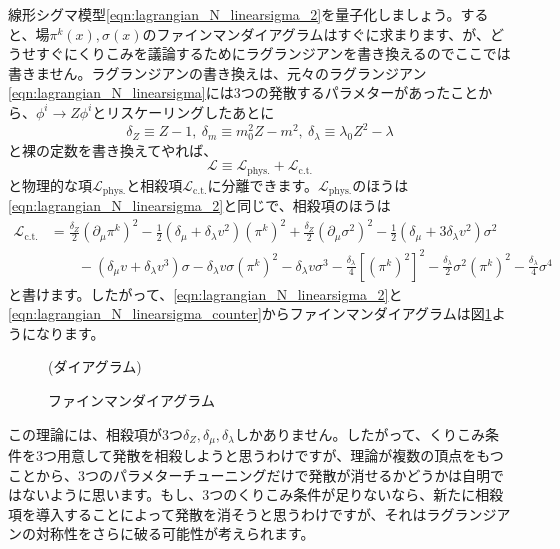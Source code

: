 \documentclass[unicode,a4paper,11pt]{ltjsarticle}
\theoremstyle{definition}
\begin{document}
線形シグマ模型\eqref{eqn:lagrangian_N_linearsigma_2}を量子化しましょう。すると、場$\pi^{k}(x),\sigma(x)$のファインマンダイアグラムはすぐに求まります、が、どうせすぐにくりこみを議論するためにラグランジアンを書き換えるのでここでは書きません。ラグランジアンの書き換えは、元々のラグランジアン\eqref{eqn:lagrangian_N_linearsigma}には3つの発散するパラメターがあったことから、$\phi^{i}\rightarrow Z\phi^{i}$とリスケーリングしたあとに
\begin{equation}
   \delta_{Z}
   \equiv
   Z-1
   ,\
   \delta_{m}
   \equiv
   m_{0}^2Z-m^2
   ,\
   \delta_{\lambda}
   \equiv
   \lambda_{0}Z^2
   -
   \lambda
\end{equation}
と裸の定数を書き換えてやれば、
\begin{equation}
   \mathcal{L}
   \equiv
   \mathcal{L}_{\mathrm{phys.}}+\mathcal{L}_{\mathrm{c.t.}}
\end{equation}
と物理的な項$\mathcal{L}_{\mathrm{phys.}}$と相殺項$\mathcal{L}_{\mathrm{c.t.}}$に分離できます。$\mathcal{L}_{\mathrm{phys.}}$のほうは\eqref{eqn:lagrangian_N_linearsigma_2}と同じで、相殺項のほうは
\begin{align}
   \mathcal{L}_{\mathrm{c.t.}}
    & =
   \frac{\delta_{Z}}{2}(\partial_{\mu}\pi^{k})^2
   -
   \frac{1}{2}(\delta_{\mu}+\delta_{\lambda}v^2)(\pi^{k})^2
   +
   \frac{\delta_{Z}}{2}(\partial_{\mu}\sigma^2)^2
   -
   \frac{1}{2}(\delta_{\mu}+3\delta_{\lambda}v^2)\sigma^2
   \nonumber
   \\
    & \qquad
   -
   (\delta_{\mu}v+\delta_{\lambda}v^3)\sigma
   -
   \delta_{\lambda}v\sigma(\pi^{k})^2
   -
   \delta_{\lambda}v\sigma^3
   -
   \frac{\delta_{\lambda}}{4}[(\pi^{k})^2]^2
   -
   \frac{\delta_{\lambda}}{2}\sigma^{2}(\pi^{k})^2
   -
   \frac{\delta_{\lambda}}{4}\sigma^4
   \label{eqn:lagrangian_N_linearsigma_counter}
\end{align}
と書けます。したがって、\eqref{eqn:lagrangian_N_linearsigma_2}と\eqref{eqn:lagrangian_N_linearsigma_counter}からファインマンダイアグラムは図\ref{fig:feynman_1}ようになります。

\begin{figure}[ht]
   \centering
   (ダイアグラム)
   \caption{ファインマンダイアグラム}
   \label{fig:feynman_1}
\end{figure}

この理論には、相殺項が3つ$\delta_{Z},\delta_{\mu},\delta_{\lambda}$しかありません。したがって、くりこみ条件を3つ用意して発散を相殺しようと思うわけですが、理論が複数の頂点をもつことから、3つのパラメターチューニングだけで発散が消せるかどうかは自明ではないように思います。もし、3つのくりこみ条件が足りないなら、新たに相殺項を導入することによって発散を消そうと思うわけですが、それはラグランジアンの対称性をさらに破る可能性が考えられます。
\end{document}
